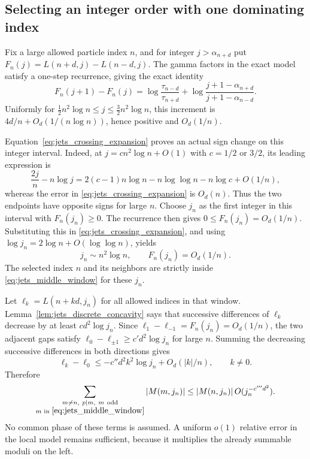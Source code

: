 \documentclass[11pt]{article}
\numberwithin{equation}{section}
\theoremstyle{definition}
\begin{document}
\subsection{Selecting an integer order with one dominating index}

Fix a large allowed particle index $n$, and for integer
$j>\alpha_{n+d}$ put
$F_n(j)=L(n+d,j)-L(n-d,j)$.  The gamma factors in the exact model
satisfy a one-step recurrence, giving the exact identity
\begin{equation}\label{eq:jets_crossing_derivative}
 F_n(j+1)-F_n(j)
 =\log\frac{\tau_{n-d}}{\tau_{n+d}}
   +\log\frac{j+1-\alpha_{n+d}}{j+1-\alpha_{n-d}}.
\end{equation}
Uniformly for $\tfrac12n^2\log n\le j\le\tfrac32n^2\log n$,
this increment is $4d/n+O_d(1/(n\log n))$, hence positive and
$O_d(1/n)$.

Equation~\eqref{eq:jets_crossing_expansion} proves an actual sign
change on this integer interval.  Indeed, at
$j=c n^2\log n+O(1)$ with $c=1/2$ or $3/2$, its leading expression is
\[
 \frac{2j}{n}-n\log j
   =2(c-1)n\log n-n\log\log n-n\log c+O(1/n),
\]
whereas the error in \eqref{eq:jets_crossing_expansion} is $O_d(n)$.
Thus the two endpoints have opposite signs for large $n$.
Choose $j_n$ as the first integer in this interval with $F_n(j_n)\ge0$.
The recurrence then gives $0\le F_n(j_n)=O_d(1/n)$.  Substituting
this in \eqref{eq:jets_crossing_expansion}, and using
$\log j_n=2\log n+O(\log\log n)$, yields
\begin{equation}\label{eq:jets_selected_j}
 j_n\sim n^2\log n,\qquad F_n(j_n)=O_d(1/n).
\end{equation}
The selected index $n$ and its neighbors are strictly inside
\eqref{eq:jets_middle_window} for these $j_n$.

Let $\ell_k=L(n+kd,j_n)$ for all allowed indices in that window.
Lemma~\ref{lem:jets_discrete_concavity} says that successive differences
of $\ell_k$ decrease by at least $cd^2\log j_n$.
Since $\ell_1-\ell_{-1}=F_n(j_n)=O_d(1/n)$, the two adjacent gaps
satisfy $\ell_0-\ell_{\pm1}\ge c'd^2\log j_n$ for large $n$.
Summing the decreasing successive differences in both directions gives
\[
 \ell_k-\ell_0\le-c''d^2 k^2\log j_n+O_d(|k|/n),\qquad k\ne0.
\]
Therefore
\begin{equation}\label{eq:jets_single_index}
 \sum_{\substack{m\ne n,\ p\mid m,\ m\ \mathrm{odd}\\
                  m\text{ in }\eqref{eq:jets_middle_window}}}
 |M(m,j_n)|
 \le |M(n,j_n)|\,O(j_n^{-c'''d^2}).
\end{equation}
No common phase of these terms is assumed.  A uniform $o(1)$ relative
error in the local model remains sufficient, because it multiplies
the already summable moduli on the left.
\end{document}
